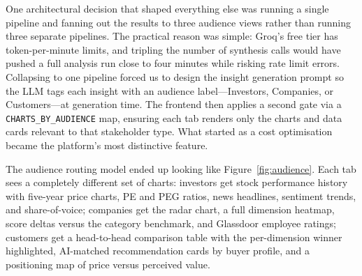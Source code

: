 \documentclass[9pt, a4paper, twocolumn]{article}
\begin{document}
One architectural decision that shaped everything else was running a single pipeline and fanning out the results to three audience views rather than running three separate pipelines. The practical reason was simple: Groq's free tier has token-per-minute limits, and tripling the number of synthesis calls would have pushed a full analysis run close to four minutes while risking rate limit errors. Collapsing to one pipeline forced us to design the insight generation prompt so the LLM tags each insight with an audience label---Investors, Companies, or Customers---at generation time. The frontend then applies a second gate via a \texttt{CHARTS\_BY\_AUDIENCE} map, ensuring each tab renders only the charts and data cards relevant to that stakeholder type. What started as a cost optimisation became the platform's most distinctive feature.

The audience routing model ended up looking like Figure~\ref{fig:audience}. Each tab sees a completely different set of charts: investors get stock performance history with five-year price charts, PE and PEG ratios, news headlines, sentiment trends, and share-of-voice; companies get the radar chart, a full dimension heatmap, score deltas versus the category benchmark, and Glassdoor employee ratings; customers get a head-to-head comparison table with the per-dimension winner highlighted, AI-matched recommendation cards by buyer profile, and a positioning map of price versus perceived value.
\end{document}
